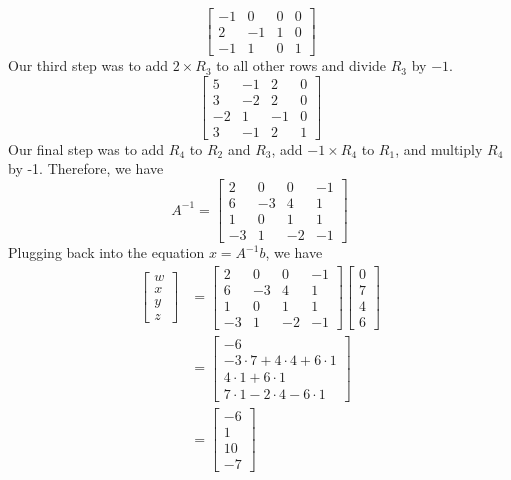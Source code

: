 \documentclass[11pt, letterpaper, twoside]{article}
\begin{document}
\begin{enumerate}
\begin{enumerate}[label=(\alph*)]
$$\begin{bmatrix}
-1 & 0 & 0 & 0\\
2 & -1 & 1 & 0\\
-1 & 1 & 0 & 1
\end{bmatrix}$$
Our third step was to add $2\times R_3$ to all other rows and divide $R_3$ by $-1$.
$$\begin{bmatrix}
5 & -1 & 2 &0\\
3 & -2 & 2 & 0\\
-2 & 1 & -1 & 0\\
3 & -1 & 2 & 1
\end{bmatrix}$$
Our final step was to add $R_4$ to $R_2$ and $R_3$, add $-1\times R_4$ to $R_1$, and multiply $R_4$ by -1. Therefore, we have
$$A^{-1}=\begin{bmatrix}
2 & 0 & 0 &-1\\
6 & -3 & 4 & 1\\
1 & 0 & 1 & 1\\
-3 & 1 & -2 & -1
\end{bmatrix}$$%
Plugging back into the equation $x=A^{-1}b$, we have
\begin{align*}
\begin{bmatrix}
w \\
x \\
y \\
z
\end{bmatrix}&=\begin{bmatrix}
2 & 0 & 0 &-1\\
6 & -3 & 4 & 1\\
1 & 0 & 1 & 1\\
-3 & 1 & -2 & -1
\end{bmatrix}
\begin{bmatrix}
0 \\
7 \\
4 \\
6
\end{bmatrix}\\
&=\begin{bmatrix}
-6 \\
-3\cdot 7 +4\cdot4+6\cdot1 \\
4\cdot1+6\cdot1 \\
7\cdot1-2\cdot4-6\cdot1
\end{bmatrix}\\
&=\begin{bmatrix}
-6 \\
1 \\
10 \\
-7
\end{bmatrix}
\end{align*}

\end{enumerate}
\end{enumerate}
\end{document}
